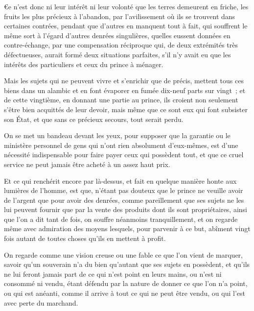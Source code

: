 \documentclass[french,twoside]{book} %
\begin{document}
€e n’est donc ni leur intérêt ni leur volonté que les terres demeurent en friche, les fruits les plus précieux à l’abandon, par l’avilissement où ils se trouvent dans certaines contrées, pendant que d’autres en manquent tout à fait, qui souffrent le même sort à l’égard d’autres denrées singulières, quelles eussent données en contre-échange, par une compensation réciproque qui, de deux extrémités très défectueuses, aurait formé deux situations parfaites, s’il n’y avait eu que les intérêts des particuliers et ceux du prince à ménager.\par
Mais les sujets qui ne peuvent vivre et s’enrichir que de précis, mettent tous ces biens dans un alambic et en font évaporer en fumée dix-neuf parts sur vingt ; et de cette vingtième, en donnant une partie au prince, ils croient non seulement s’être bien acquittés de leur devoir, mais même que ce sont eux qui font subsister son État, et que sans ce précieux secours, tout serait perdu.\par
On se met un bandeau devant les yeux, pour supposer que la garantie ou le ministère personnel de gens qui n’ont rien absolument d’eux-mêmes, est d’une nécessité indispensable pour faire payer ceux qui possèdent tout, et que ce cruel service ne peut jamais être acheté à un assez haut prix.\par
Et ce qui renchérit encore par là-dessus, et fait en quelque manière honte aux lumières de l’homme, est que, n’étant pas douteux que le prince ne veuille avoir de l’argent que pour avoir des denrées, comme pareillement que ses sujets ne les lui peuvent fournir que par la vente des produits dont ils sont propriétaires, ainsi que l’on a dit tant de fois, on souffre néanmoins tranquillement, et on regarde même avec admiration des moyens lesquels, pour parvenir à ce but, abîment vingt fois autant de toutes choses qu’ils en mettent à profit.\par
On regarde comme une vision creuse ou une fable ce que l’on vient de marquer, savoir qu’un souverain n’a du bien qu’autant que ses sujets en possèdent, et qu’ils ne lui feront jamais part de ce qui n’est point en leurs mains, ou n’est ni consommé ni vendu, étant défendu par la nature de donner ce que l’on n’a point, ou qui est anéanti, comme il arrive à tout ce qui ne peut être vendu, ou qui l’est avec perte du marchand.\par
\end{document}
